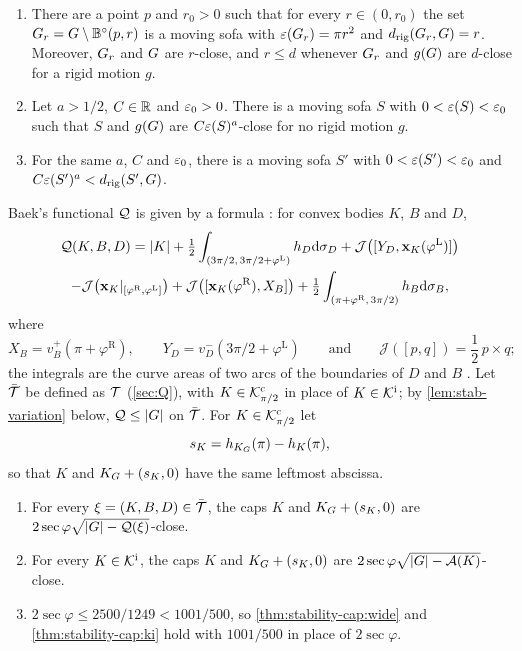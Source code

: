 \begin{theorem}\label{thm:stability-exponent}
\begin{enumerate}[label=(\alph*)]
\item\label{thm:stability-exponent:family} There are a point $p$ and $r_0>0$
such that for every $r\in(0,r_0)$ the set $G_r=G\setminus\mathbb
B^\circ(p,r)$ is a moving sofa with $\varepsilon(G_r)=\pi r^2$ and
$d_{\mathrm{rig}}(G_r,G)=r$. Moreover, $G_r$ and $G$ are $r$-close,
and $r\le d$ whenever $G_r$ and $g(G)$ are $d$-close for a rigid motion
$g$.
\item\label{thm:stability-exponent:no} Let $a>1/2$, $C\in\mathbb{R}$ and $\varepsilon_0>0$.
There is a moving sofa $S$ with $0<\varepsilon(S)<\varepsilon_0$ such that $S$ and $g(G)$
are $C\varepsilon(S)^a$-close for no rigid motion $g$.
\item\label{thm:stability-exponent:rig} For the same $a$, $C$ and $\varepsilon_0$,
there is a moving sofa $S'$ with $0<\varepsilon(S')<\varepsilon_0$ and
$C\varepsilon(S')^a<d_{\mathrm{rig}}(S',G)$.
\end{enumerate}
\end{theorem}

Baek's functional $\mathcal{Q}$ is given by a formula : for convex
bodies $K$, $B$ and $D$,
\begin{multline}\label{eq:stab-Q}
  \mathcal{Q}(K,B,D)=\lvert K\rvert
  +\tfrac12\int_{(3\pi/2,\,3\pi/2+\varphi^{\mathrm L})}h_D\mathrm{d}\sigma_D
  +\mathcal J\bigl([Y_D,\mathbf{x}_K(\varphi^{\mathrm L})]\bigr)\\
  -\mathcal J\bigl(\mathbf{x}_K|_{[\varphi^{\mathrm R},\varphi^{\mathrm L}]}\bigr)
  +\mathcal J\bigl([\mathbf{x}_K(\varphi^{\mathrm R}),X_B]\bigr)
  +\tfrac12\int_{(\pi+\varphi^{\mathrm R},\,3\pi/2)}h_B\mathrm{d}\sigma_B ,
\end{multline}
where
\[
  X_B=v_B^+(\pi+\varphi^{\mathrm R}),\qquad
  Y_D=v_D^-(3\pi/2+\varphi^{\mathrm L})\qquad\text{and}\qquad
  \mathcal J([p,q])=\frac12\,p\times q;
\]
the integrals are the curve areas of two arcs of the boundaries of $D$ and $B$
. Let $\bar{\mathcal{T}}$ be defined as $\mathcal{T}$ (\cref{sec:Q}), with
$K\in\mathcal{K}^{\mathrm{c}}_{\pi/2}$ in place of $K\in\mathcal{K}^{\mathrm{i}}$; by \cref{lem:stab-variation} below,
$\mathcal{Q}\le\lvert G\rvert$ on $\bar{\mathcal{T}}$. For $K\in\mathcal{K}^{\mathrm{c}}_{\pi/2}$ let
\[
  s_K=h_{K_G}(\pi)-h_K(\pi),
\]
so that $K$ and $K_G+(s_K,0)$ have the same leftmost abscissa.

\begin{theorem}\label{thm:stability-cap}
\begin{enumerate}[label=(\alph*)]
\item\label{thm:stability-cap:wide} For every $\xi=(K,B,D)\in\bar{\mathcal{T}}$, the
caps $K$ and $K_G+(s_K,0)$ are $2\sec\varphi\sqrt{\lvert G\rvert-\mathcal{Q}(\xi)}$-close.
\item\label{thm:stability-cap:ki} For every $K\in\mathcal{K}^{\mathrm{i}}$, the caps $K$ and
$K_G+(s_K,0)$ are $2\sec\varphi\sqrt{\lvert G\rvert-\mathcal{A}(K)}$-close.
\item\label{thm:stability-cap:num} $2\sec\varphi\le2500/1249<1001/500$, so
\ref{thm:stability-cap:wide} and \ref{thm:stability-cap:ki} hold with
$1001/500$ in place of $2\sec\varphi$.
\end{enumerate}
\end{theorem}

